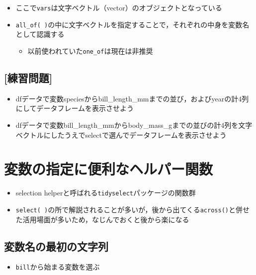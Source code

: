 \documentclass[
  xelatex,ja=standard, b5paper]{bxjsbook}
\providecommand{\tightlist}{%
  \setlength{\itemsep}{0pt}\setlength{\parskip}{0pt}}
\begin{document}
\begin{itemize}
\tightlist
\item
  ここで\texttt{vars}は文字ベクトル（vector）のオブジェクトとなっている
\item
  \texttt{all\_of(\ )}の中に文字ベクトルを指定することで，それぞれの中身を変数名として認識する

  \begin{itemize}
  \tightlist
  \item
    以前使われていた\texttt{one\_of}は現在は非推奨
  \end{itemize}
\end{itemize}

\hypertarget{ux7df4ux7fd2ux554fux984c}{%
\subsection{{[}練習問題{]}}\label{ux7df4ux7fd2ux554fux984c}}

\begin{itemize}
\tightlist
\item
  dfデータで変数speciesからbill\_length\_mmまでの並び，およびyearの計4列にしてデータフレームを表示させよう
\item
  dfデータで変数bill\_length\_mmからbody\_mass\_gまでの並びの計4列を文字ベクトルにしたうえでselectで選んでデータフレームを表示させよう
\end{itemize}

\hypertarget{select-helper}{%
\section{変数の指定に便利なヘルパー関数}\label{select-helper}}

\begin{itemize}
\tightlist
\item
  selection helperと呼ばれる\texttt{tidyselect}パッケージの関数群
\item
  \texttt{select(\ )}の所で解説されることが多いが，後から出てくる\texttt{across()}と併せた活用場面が多いため，なじんでおくと後から楽になる
\end{itemize}

\hypertarget{select-helper1}{%
\subsection{変数名の最初の文字列}\label{select-helper1}}

\begin{itemize}
\tightlist
\item
  \texttt{bill}から始まる変数を選ぶ
\end{itemize}
\end{document}
